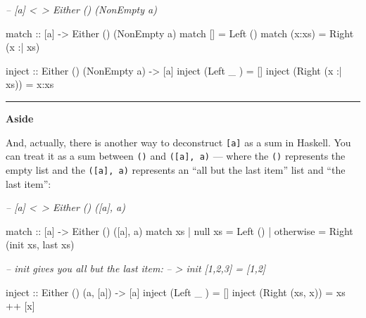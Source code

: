 \documentclass[]{article}
\newenvironment{Shaded}{}{}
\newcommand{\CommentTok}[1]{\textcolor[rgb]{0.38,0.63,0.69}{\textit{#1}}}
\newcommand{\DataTypeTok}[1]{\textcolor[rgb]{0.56,0.13,0.00}{#1}}
\newcommand{\FunctionTok}[1]{\textcolor[rgb]{0.02,0.16,0.49}{#1}}
\newcommand{\NormalTok}[1]{#1}
\newcommand{\OtherTok}[1]{\textcolor[rgb]{0.00,0.44,0.13}{#1}}
\begin{document}
\begin{Shaded}
\begin{Highlighting}[]
\CommentTok{-- [a] <~> Either () (NonEmpty a)}

\OtherTok{match ::}\NormalTok{ [a] }\OtherTok{->} \DataTypeTok{Either}\NormalTok{ () (}\DataTypeTok{NonEmpty}\NormalTok{ a)}
\NormalTok{match []     }\FunctionTok{=} \DataTypeTok{Left}\NormalTok{  ()}
\NormalTok{match (x}\FunctionTok{:}\NormalTok{xs) }\FunctionTok{=} \DataTypeTok{Right}\NormalTok{ (x }\FunctionTok{:|}\NormalTok{ xs)}

\OtherTok{inject ::} \DataTypeTok{Either}\NormalTok{ () (}\DataTypeTok{NonEmpty}\NormalTok{ a) }\OtherTok{->}\NormalTok{ [a]}
\NormalTok{inject (}\DataTypeTok{Left}\NormalTok{   _       ) }\FunctionTok{=}\NormalTok{ []}
\NormalTok{inject (}\DataTypeTok{Right}\NormalTok{ (x }\FunctionTok{:|}\NormalTok{ xs)) }\FunctionTok{=}\NormalTok{ x}\FunctionTok{:}\NormalTok{xs}
\end{Highlighting}
\end{Shaded}

\begin{center}\rule{0.5\linewidth}{\linethickness}\end{center}

\textbf{Aside}

And, actually, there is another way to deconstruct \texttt{{[}a{]}} as a sum in
Haskell. You can treat it as a sum between \texttt{()} and
\texttt{({[}a{]},\ a)} --- where the \texttt{()} represents the empty list and
the \texttt{({[}a{]},\ a)} represents an ``all but the last item'' list and
``the last item'':

\begin{Shaded}
\begin{Highlighting}[]
\CommentTok{-- [a] <~> Either () ([a], a)}

\OtherTok{match  ::}\NormalTok{ [a] }\OtherTok{->} \DataTypeTok{Either}\NormalTok{ () ([a], a)}
\NormalTok{match xs}
  \FunctionTok{|}\NormalTok{ null xs   }\FunctionTok{=} \DataTypeTok{Left}\NormalTok{  ()}
  \FunctionTok{|}\NormalTok{ otherwise }\FunctionTok{=} \DataTypeTok{Right}\NormalTok{ (init xs, last xs)}

\CommentTok{-- init gives you all but the last item:}
\CommentTok{-- > init [1,2,3] = [1,2]}

\OtherTok{inject ::} \DataTypeTok{Either}\NormalTok{ () (a, [a]) }\OtherTok{->}\NormalTok{ [a]}
\NormalTok{inject (}\DataTypeTok{Left}\NormalTok{   _     ) }\FunctionTok{=}\NormalTok{ []}
\NormalTok{inject (}\DataTypeTok{Right}\NormalTok{ (xs, x)) }\FunctionTok{=}\NormalTok{ xs }\FunctionTok{++}\NormalTok{ [x]}
\end{Highlighting}
\end{Shaded}
\end{document}
